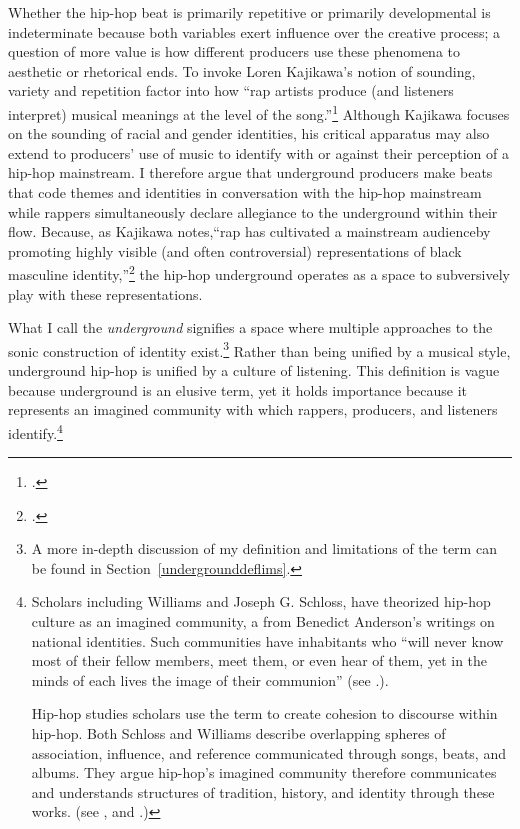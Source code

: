 Whether the hip-hop beat is primarily repetitive or primarily developmental is indeterminate
because both variables exert influence over the creative process; a question of more value is
how different producers use these phenomena to aesthetic or rhetorical ends. To invoke Loren
Kajikawa's notion of sounding, variety and repetition factor into how ``rap artists produce 
(and listeners interpret) musical meanings at the level of the song.''\footnote{
    \autocite[2]{lorenkajikawaSoundingRaceRap2015}.} 
Although Kajikawa focuses on the sounding of racial and gender identities, his critical apparatus
may also extend to producers' use of music to identify with or against their perception of a 
hip-hop mainstream. I therefore argue that underground producers make beats that code themes and
identities in conversation with the hip-hop mainstream while rappers simultaneously declare allegiance
to the underground within their flow. Because, as Kajikawa notes,``rap has cultivated a mainstream
audience\textellipsis by promoting highly visible (and often controversial) representations of 
black masculine identity,''\footnote{
    \autocite[5]{lorenkajikawaSoundingRaceRap2015}.} 
the hip-hop underground operates as a  space to subversively play with these representations.

What I call the \emph{underground} signifies a space where multiple approaches to the sonic
construction of identity exist.\footnote{
    A more in-depth discussion of my definition and limitations of the term can be found in 
    Section~\ref{undergrounddeflims}.} 
Rather than being unified by a musical style, underground hip-hop is unified by a culture 
of listening. This definition is vague because underground is an elusive term, yet it holds
importance because it represents an imagined community with which rappers, producers, and
listeners identify.\footnote{
    Scholars including Williams and Joseph G. Schloss, have theorized hip-hop culture as 
    an imagined community, a from Benedict Anderson's writings on national identities. 
    Such communities have inhabitants who ``will never  know most of their fellow
    members, meet them, or even hear of them, yet in the minds of each lives the image of
    their  communion'' (see \autocite[6]{benedictandersonImaginedCommunitiesReflections2006}.).

    Hip-hop studies scholars use the term to create cohesion to discourse within hip-hop. 
    Both Schloss and Williams describe overlapping spheres of association, influence, and
    reference communicated through songs, beats, and albums. They argue hip-hop's imagined
    community therefore communicates and understands structures of tradition, history, and
    identity through these works. (see \autocite[4]{josephgschlossMakingBeatsArt2004}, and
    \autocite[12--13]{justinawilliamsRhyminStealinMusical2013}.)}

